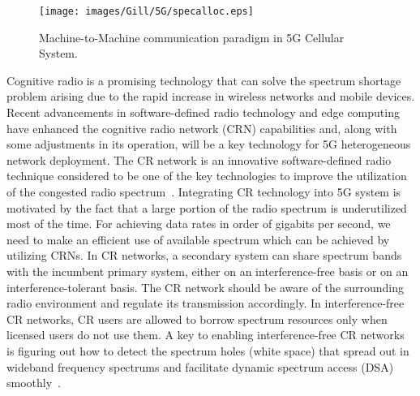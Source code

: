 \begin{figure}[!ht]
	\centering
\texttt{[image: images/Gill/5G/specalloc.eps]}
	\caption{Machine-to-Machine communication paradigm in 5G Cellular System.}
	\label{specalloc}
\end{figure}

Cognitive radio is a promising technology that can solve the spectrum shortage problem arising due to the rapid increase in wireless networks and mobile devices. Recent advancements in software-defined radio technology and edge computing have enhanced the cognitive radio network (CRN)  capabilities and, along with some adjustments in its operation, will be a key technology for 5G heterogeneous network deployment.  The CR network is an innovative software-defined radio technique considered to be one of the key technologies to improve the utilization of the congested radio spectrum~\cite{rusek2013scaling}. Integrating CR technology into 5G system is motivated by the fact that a large portion of the radio spectrum is underutilized most of the time. For achieving data rates in order of gigabits per second, we need to make an efficient use of available spectrum which can be achieved by utilizing CRNs. In CR networks, a secondary system can share spectrum bands with the incumbent primary system, either on an interference-free basis or on an interference-tolerant basis. The CR network should be aware of
the surrounding radio environment and regulate its transmission accordingly. In interference-free CR networks, CR users are allowed to borrow spectrum resources only when licensed users do
not use them. A key to enabling interference-free CR networks is figuring out how to detect the spectrum holes (white space) that spread out in wideband frequency spectrums and facilitate dynamic spectrum access (DSA) smoothly~\cite{wyglinski2009cognitive}. 


